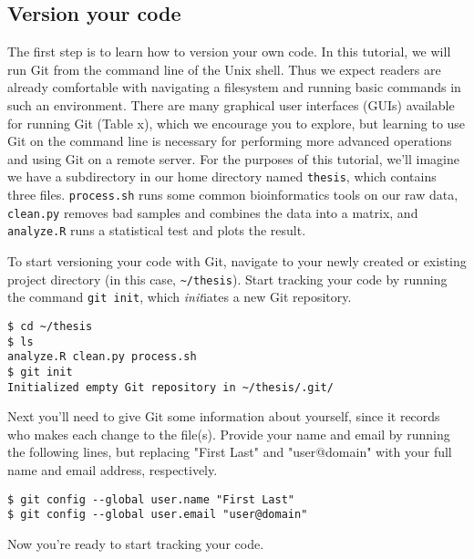 \subsection{Version your code}

The first step is to learn how to version your own code. In this tutorial, we will run Git from the command line of the Unix shell. Thus we expect readers are already comfortable with navigating a filesystem and running basic commands in such an environment. There are many graphical user interfaces (GUIs) available for running Git (Table x), which we encourage you to explore, but learning to use Git on the command line is necessary for performing more advanced operations and using Git on a remote server. For the purposes of this tutorial, we'll imagine we have a subdirectory in our home directory named \verb|thesis|, which contains three files. \verb|process.sh| runs some common bioinformatics tools on our raw data, \verb|clean.py| removes bad samples and combines the data into a matrix, and \verb|analyze.R| runs a statistical test and plots the result.

To start versioning your code with Git, navigate to your newly created or existing project directory (in this case, \verb|~/thesis|).  Start tracking your code by running the command \verb|git init|, which \textit{init}iates a new Git repository.

\begin{lstlisting}
$ cd ~/thesis
$ ls
analyze.R clean.py process.sh
$ git init
Initialized empty Git repository in ~/thesis/.git/
\end{lstlisting}

Next you'll need to give Git some information about yourself, since it records who makes each change to the file(s). Provide your name and email by running the following lines, but replacing "First Last" and "user@domain" with your full name and email address, respectively.

\begin{lstlisting}
$ git config --global user.name "First Last"
$ git config --global user.email "user@domain"
\end{lstlisting}

Now you're ready to start tracking your code.